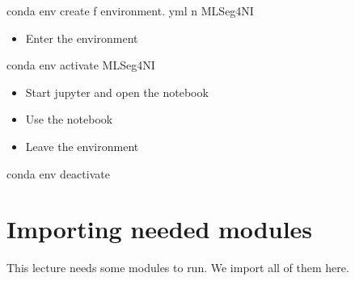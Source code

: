 \documentclass[letterpaper,10pt,english]{sphinxmanual}
\begin{document}
\begin{sphinxVerbatim}[commandchars=\\\{\}]
conda env create \PYGZhy{}f environment. yml \PYGZhy{}n MLSeg4NI
\end{sphinxVerbatim}
\begin{itemize}
\item {} 
Enter the environment

\end{itemize}

\begin{sphinxVerbatim}[commandchars=\\\{\}]
conda env activate MLSeg4NI
\end{sphinxVerbatim}
\begin{itemize}
\item {} 
Start jupyter and open the notebook 

\item {} 
Use the notebook

\item {} 
Leave the environment

\end{itemize}

\begin{sphinxVerbatim}[commandchars=\\\{\}]
conda env deactivate
\end{sphinxVerbatim}


\section{Importing needed modules}
\label{\detokenize{ML4NeutronImageSegmentation:importing-needed-modules}}
This lecture needs some modules to run. We import all of them here.
\end{document}
